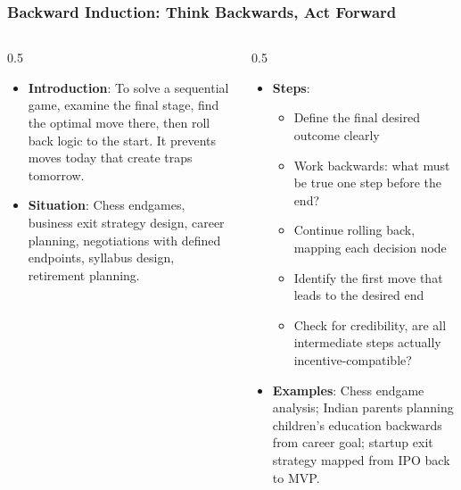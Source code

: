 \begin{frame}[fragile]\frametitle{Backward Induction: Think Backwards, Act Forward}
\begin{columns}
    \begin{column}[T]{0.5\linewidth}
      \begin{itemize}
        \item \textbf{Introduction}: To solve a sequential game, examine the final stage, find the optimal move there, then roll back logic to the start. It prevents moves today that create traps tomorrow.
        \item \textbf{Situation}: Chess endgames, business exit strategy design, career planning, negotiations with defined endpoints, syllabus design, retirement planning.
      \end{itemize}
    \end{column}
    \begin{column}[T]{0.5\linewidth}
      \begin{itemize}
        \item \textbf{Steps}:
        \begin{itemize}
          \item Define the final desired outcome clearly
          \item Work backwards: what must be true one step before the end?
          \item Continue rolling back, mapping each decision node
          \item Identify the first move that leads to the desired end
          \item Check for credibility, are all intermediate steps actually incentive-compatible?
        \end{itemize}\item \textbf{Examples}: Chess endgame analysis; Indian parents planning children's education backwards from career goal; startup exit strategy mapped from IPO back to MVP.
      \end{itemize}
    \end{column}
  \end{columns}
\end{frame}



